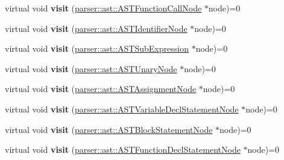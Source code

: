 \begin{DoxyCompactItemize}
\item 
\mbox{\label{classvisitor_1_1Visitor_ad22e615f265631f68b499c4d06ae63d4}} 
virtual void {\bfseries visit} (\hyperlink{classparser_1_1ast_1_1ASTFunctionCallNode}{parser\+::ast\+::\+A\+S\+T\+Function\+Call\+Node} $\ast$node)=0
\item 
\mbox{\label{classvisitor_1_1Visitor_a5812aac1e9cdcfc8ef582e0a2c2a29d3}} 
virtual void {\bfseries visit} (\hyperlink{classparser_1_1ast_1_1ASTIdentifierNode}{parser\+::ast\+::\+A\+S\+T\+Identifier\+Node} $\ast$node)=0
\item 
\mbox{\label{classvisitor_1_1Visitor_a5b6bc3dd238795ca2206605c54c4fdf7}} 
virtual void {\bfseries visit} (\hyperlink{classparser_1_1ast_1_1ASTSubExpression}{parser\+::ast\+::\+A\+S\+T\+Sub\+Expression} $\ast$node)=0
\item 
\mbox{\label{classvisitor_1_1Visitor_a7822b18b878fe2d9d788a0a56313f8a7}} 
virtual void {\bfseries visit} (\hyperlink{classparser_1_1ast_1_1ASTUnaryNode}{parser\+::ast\+::\+A\+S\+T\+Unary\+Node} $\ast$node)=0
\item 
\mbox{\label{classvisitor_1_1Visitor_a4e7e68544d2a28f47d9ff6084bb57e12}} 
virtual void {\bfseries visit} (\hyperlink{classparser_1_1ast_1_1ASTAssignmentNode}{parser\+::ast\+::\+A\+S\+T\+Assignment\+Node} $\ast$node)=0
\item 
\mbox{\label{classvisitor_1_1Visitor_ae7a764f5d7b69d3331c8043081d9ad56}} 
virtual void {\bfseries visit} (\hyperlink{classparser_1_1ast_1_1ASTVariableDeclStatementNode}{parser\+::ast\+::\+A\+S\+T\+Variable\+Decl\+Statement\+Node} $\ast$node)=0
\item 
\mbox{\label{classvisitor_1_1Visitor_addd6d63a62fe049777355144c2f0f0c2}} 
virtual void {\bfseries visit} (\hyperlink{classparser_1_1ast_1_1ASTBlockStatementNode}{parser\+::ast\+::\+A\+S\+T\+Block\+Statement\+Node} $\ast$node)=0
\item 
\mbox{\label{classvisitor_1_1Visitor_af26df6fe50b4db86c35469271e91ab63}} 
virtual void {\bfseries visit} (\hyperlink{classparser_1_1ast_1_1ASTFunctionDeclStatementNode}{parser\+::ast\+::\+A\+S\+T\+Function\+Decl\+Statement\+Node} $\ast$node)=0

\end{DoxyCompactItemize}
